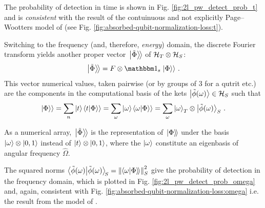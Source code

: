 \citereset
The probability of detection in time is shown in Fig. \ref{fig:2l_pw_detect_prob_t}
and is \emph{consistent} with the result of
the contuinuous and not explicitly Page--Wootters model of
\cite{RuschhauptAbsorption} (see Fig. \ref{fig:absorbed-qubit-normalization-loss:t}).

Switching to the frequency (and, therefore, \emph{energy}) domain,
the discrete Fourier transform yields another proper vector
$\left.\left| \tilde{\Phi} \right\rangle\!\right\rangle$ of $\mathcal{H}_T \otimes \mathcal{H}_S$:
\begin{equation}
  \Dket{\tilde{\Phi}} = F \ox \idop_s \dket{\Phi} \, \text{.}
\end{equation}
This vector numerical values, taken pairwise
(or by groups of 3 for a qutrit etc.)
are the components in the computational basis
of the kets $\ket{\tilde{\phi}(\omega)} \in \mathcal{H}_S$
such that
\begin{equation}
  \left.\left| \Phi \right\rangle\right\rangle = \sum_n \ket{t}\!\left.\left\langle t \middle| \Phi \right\rangle\right\rangle = \sum_{\omega} \ket{\omega}\!\left.\left\langle \omega \middle| \Phi \right\rangle\right\rangle
    = \sum_{\omega} \ket{\omega}_T \otimes \ket{\tilde{\phi}(\omega)}_S \, \text{.}
\end{equation}

As a numerical array, $\left.\left| \tilde{\Phi} \right\rangle\!\right\rangle$ is the representation of $\left.\left| \Phi \right\rangle\!\right\rangle$
under the basis $\ket{\omega} \otimes \ket{0,1}$ instead of $\ket{t} \otimes \ket{0,1}$,
where the $\ket{\omega}$ constitute an eigenbasis of angular frequency $\hat{\Omega}$.

\citereset
The squared norms $\braket{\tilde{\phi}(\omega)}_{\!S} = \norm{\!\left.\left\langle \omega \middle| \Phi \right\rangle\!\right\rangle}_S^2$
give the probability of detection in the frequency domain, which is plotted in
Fig. \ref{fig:2l_pw_detect_prob_omega} and, again, consistent
with Fig. \ref{fig:absorbed-qubit-normalization-loss:omega} i.e.
the result from the model of \cite{RuschhauptAbsorption}.

